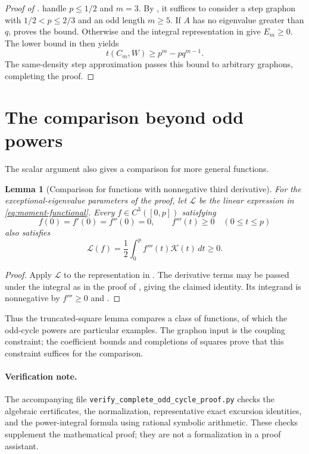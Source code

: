 \documentclass[11pt]{article}
\numberwithin{equation}{section}
\newtheorem{lemma}[theorem]{Lemma}
\begin{document}
\begin{proof}[Proof of ]
 handle
$p\le1/2$ and $m=3$. By , it
suffices to consider a step graphon with $1/2<p\le2/3$ and an
odd length $m\ge5$.
If $A$ has no eigenvalue greater than $q$, 
proves the bound. Otherwise  and
the integral representation in  give
$E_m\ge0$. The lower bound in  then yields
\[
 t(C_m,W)\ge p^m-pq^{m-1}.
\]
The same-density step approximation passes this bound to arbitrary
graphons, completing the proof.
\end{proof}

\section*{The comparison beyond odd powers}
The scalar argument also gives a comparison for more general functions.
\begin{lemma}[Comparison for functions with nonnegative third derivative]\label{lem:function-comparison}
For the exceptional-eigenvalue parameters of the proof,
let $\mathcal L$ be the linear expression in
\eqref{eq:moment-functional}. Every $f\in C^3([0,p])$ satisfying
\[
 f(0)=f'(0)=f''(0)=0,\qquad f'''(t)\ge0\quad(0\le t\le p)
\]
also satisfies
\[
 \mathcal L(f)=\frac12\int_0^p f'''(t)\mathcal K(t)\,dt\ge0.
\]
\end{lemma}
\begin{proof}
Apply $\mathcal L$ to the representation in
. The derivative terms may be passed
under the integral as in the proof of ,
giving the claimed identity. Its integrand is nonnegative by
$f'''\ge0$ and .
\end{proof}
Thus the
truncated-square lemma compares a class of functions, of which the
odd-cycle powers are particular examples. The graphon input is the
coupling constraint; the coefficient bounds and completions of
squares prove that this constraint suffices for the comparison.

\paragraph{Verification note.}
The accompanying file \nolinkurl{verify_complete_odd_cycle_proof.py} checks the algebraic certificates, the normalization, representative exact excursion identities, and the power-integral formula using rational symbolic arithmetic. These checks supplement the mathematical proof; they are not a formalization in a proof assistant.



\end{document}

